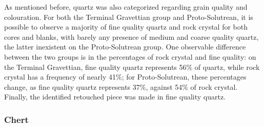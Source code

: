 \documentclass[12pt,twoside]{reedthesis}
\begin{document}
As mentioned before, quartz was also categorized regarding grain quality and colouration. For both the Terminal Gravettian group and Proto-Solutrean, it is possible to observe a majority of fine quality quartz and rock crystal for both cores and blanks, with barely any presence of medium and coarse quality quartz, the latter inexistent on the Proto-Solutrean group. One observable difference between the two groups is in the percentages of rock crystal and fine quality: on the Terminal Gravettian, fine quality quartz represents 56\% of quartz, while rock crystal has a frequency of nearly 41\%; for Proto-Solutrean, these percentages change, as fine quality quartz represents 37\%, against 54\% of rock crystal. Finally, the identified retouched piece was made in fine quality quartz.
\begin{table}

\caption{\label{tab:quartzqualityTG}Quartz quality by class (Terminal Gravettian).}
\centering
{}
\end{table}
\begin{table}

\caption{\label{tab:quartzqualityPR}Quartz quality by class (Proto-Solutrean).}
\centering
{}
\end{table}
\hypertarget{chert-1}{%
\subsubsection{Chert}\label{chert-1}}
\end{document}

